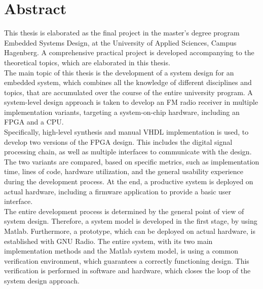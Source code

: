 \chapter{Abstract}


This thesis is elaborated as the final project in the master's degree program Embedded Systems Design, at the University of Applied Sciences, Campus Hagenberg.
A comprehensive practical project is developed accompanying to the theoretical topics, which are elaborated in this thesis.\\

The main topic of this thesis is the development of a system design for an embedded system, which combines all the knowledge of different disciplines and topics, that are accumulated over the course of the entire university program.
A system-level design approach is taken to develop an FM radio receiver in multiple implementation variants, targeting a system-on-chip hardware, including an FPGA and a CPU.\\

Specifically, high-level synthesis and manual VHDL implementation is used, to develop two versions of the FPGA design.
This includes the digital signal processing chain, as well as multiple interfaces to communicate with the design.
The two variants are compared, based on specific metrics, such as implementation time, lines of code, hardware utilization, and the general usability experience during the development process.
At the end, a productive system is deployed on actual hardware, including a firmware application to provide a basic user interface.\\

The entire development process is determined by the general point of view of system design.
Therefore, a system model is developed in the first stage, by using Matlab.
Furthermore, a prototype, which can be deployed on actual hardware, is established with GNU Radio.
The entire system, with its two main implementation methods and the Matlab system model, is using a common verification environment, which guarantees a correctly functioning design.
This verification is performed in software and hardware, which closes the loop of the system design approach.
